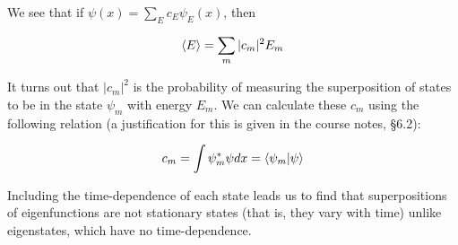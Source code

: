 We see that if $\psi(x) = \sum_E c_E \psi_E(x) $, then 

\[ \expval{E} = \sum_m |c_m|^2E_m \]

It turns out that $|c_m|^2$ is the probability of measuring the superposition of states to be in the state $\psi_m$ with energy $E_m$. We can calculate these $c_m$ using the following relation (a justification for this is given in the course notes, §6.2):

\[ c_m = \int\psi^*_m\psi dx = \bra{\psi_m}\ket{\psi}\]

Including the time-dependence of each state leads us to find that superpositions of eigenfunctions are not stationary states (that is, they vary with time) unlike eigenstates, which have no time-dependence. 

